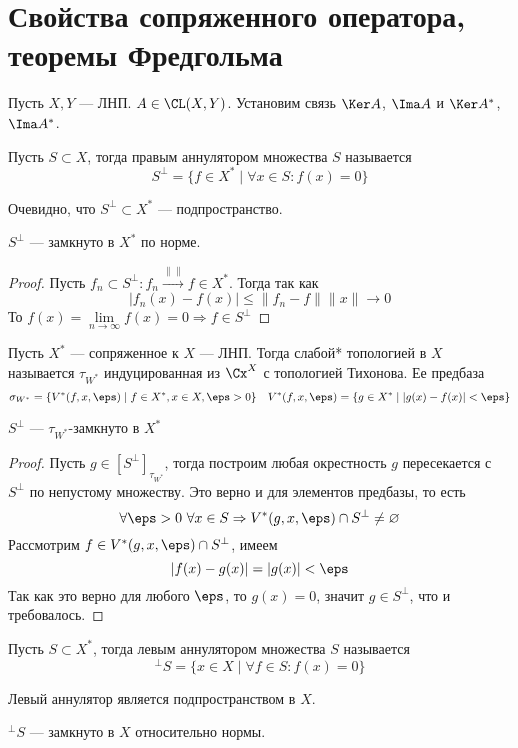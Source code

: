 \newpage
\section{Свойства сопряженного оператора, теоремы Фредгольма}
Пусть $X,Y$ --- ЛНП. $A \in \CL(X,Y)$. Установим связь $\Ker A$, $\Ima A$ и $\Ker A^*$, $\Ima A^*$. 
\begin{definition}
	Пусть $S \subset X$, тогда правым аннулятором множества $S$ называется 
	$$
	S^\perp = \{f \in X^* \mid \forall x \in S: f(x) = 0\}
	$$
\end{definition}
Очевидно, что $S^\perp \subset X^*$ --- подпространство. 
\begin{claim}
	$S^\perp$ --- замкнуто в $X^*$ по норме. 
\end{claim}
\begin{proof}
	Пусть $f_n \subset S^\perp\colon f_n \xrightarrow{\|\|}f \in X^*$. Тогда так как 
	$$
	|f_n(x) - f(x)| \leq \|f_n - f\| \|x\| \to 0
	$$
	То $f(x) = \lim\limits_{n \to \infty}f(x) = 0 \Rightarrow f \in S^\perp$
\end{proof}
\begin{definition}
	Пусть $X^*$ --- сопряженное к $X$ --- ЛНП. Тогда слабой* топологией в $X$ называется
	$
	\tau_{W^*}
	$ индуцированная из $\Cx^X$ с топологией Тихонова. Ее предбаза
	$$
	\sigma_{W^*} = \{V^*(f,x,\eps) \mid f \in X^*, x \in X, \eps> 0\} \quad V^*(f,x,\eps) = \{g \in X^* \mid |g(x) - f(x)| < \eps\}
	$$ 
\end{definition}
\begin{claim}\label{claim:twcl}
	$S^\perp$ --- $\tau_{W^*}$-замкнуто в $X^*$
\end{claim}
\begin{proof}
	Пусть $g \in [S^\perp]_{\tau_{W^*}}$, тогда построим любая окрестность $g$ пересекается с $S^\perp$ по непустому множеству. Это верно и для элементов предбазы, то есть
	$$
	\forall \eps > 0 \ \forall x \in S \Rightarrow V^*(g,x,\eps) \cap S^\perp \neq \varnothing
	$$
	Рассмотрим $f \in V^*(g,x,\eps) \cap S^\perp$, имеем
	$$
	|f(x) - g(x)| = |g(x)| < \eps 
	$$
	Так как это верно для любого $\eps$, то $g(x) = 0$, значит $g \in S^\perp$, что и требовалось.
\end{proof}
\begin{definition}
	Пусть $S \subset X^*$, тогда левым аннулятором множества $S$ называется
	$$
	^\perp S = \{x \in X \mid \forall f \in S\colon f(x) = 0\}
	$$
\end{definition}
Левый аннулятор является подпространством в $X$. 
\begin{claim}
	$^\perp S $ --- замкнуто в $X$ относительно нормы. 
\end{claim}
